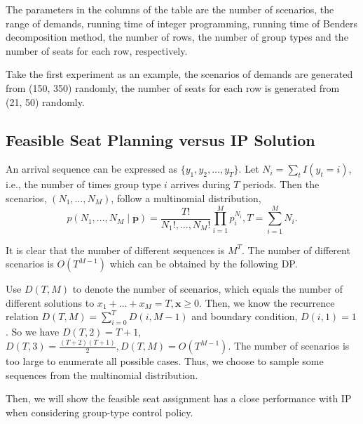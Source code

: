 The parameters in the columns of the table are the number of scenarios, the range of demands, running time of integer programming, running time of Benders decomposition method, the number of rows, the number of group types and the number of seats for each row, respectively. 

Take the first experiment as an example, the scenarios of demands are generated from (150, 350) randomly, the number of seats for each row is generated from (21, 50) randomly.



\subsection{Feasible Seat Planning versus IP Solution}
An arrival sequence can be expressed as $\{y_{1}, y_{2}, \ldots, y_{T}\}$. Let $N_{i} = \sum_{t} I(y_t = i)$, i.e., the number of times group type $i$ arrives during $T$ periods. Then the scenarios, $(N_1, \ldots, N_{M})$, follow a multinomial distribution, $$p\left(N_1, \ldots, N_{M} \mid \mathbf{p}\right)=\frac{T !}{N_{1}!, \ldots, N_{M}!} \prod_{i=1}^{M} p_{i}^{N_i}, T = \sum_{i=1}^{M} N_{i}.$$

It is clear that the number of different sequences is $M^{T}$. The number of different scenarios is $O(T^{M-1})$ which can be obtained by the following DP.

Use $D(T, M) $ to denote the number of scenarios, which equals the number of different solutions to $x_{1}+\ldots + x_{M} = T, \mathbf{x} \geq 0$. Then, we know the recurrence relation $D(T, M) = \sum_{i= 0}^{T} D(i, M-1)$ and boundary condition, $D(i,1) = 1$. So we have $D(T,2) = T+1$, $D(T,3) = \frac{(T+2)(T+1)}{2}, D(T,M) = O(T^{M-1})$. The number of scenarios is too large to enumerate all possible cases. Thus, we choose to sample some sequences from the multinomial distribution.

Then, we will show the feasible seat assignment has a close performance with IP when considering group-type control policy.

